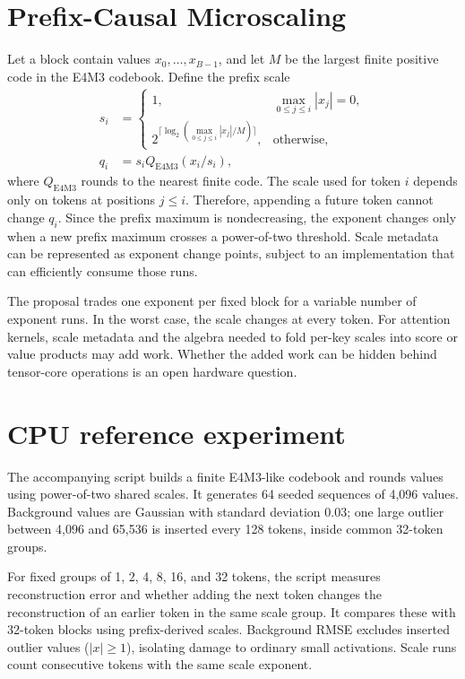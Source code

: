 \documentclass[10pt,twocolumn]{article}
\begin{document}
\section{Prefix-Causal Microscaling}
Let a block contain values $x_0,\ldots,x_{B-1}$, and let $M$ be the largest finite positive code in the E4M3 codebook. Define the prefix scale
\begin{align}
s_i &= \begin{cases}1,&\max_{0\leq j\leq i}|x_j|=0,\\2^{\lceil\log_2(\max_{0\leq j\leq i}|x_j|/M)\rceil},&\text{otherwise},\end{cases}\\
q_i &= s_i Q_{\mathrm{E4M3}}(x_i/s_i),
\end{align}
where $Q_{\mathrm{E4M3}}$ rounds to the nearest finite code. The scale used for token $i$ depends only on tokens at positions $j\leq i$. Therefore, appending a future token cannot change $q_i$. Since the prefix maximum is nondecreasing, the exponent changes only when a new prefix maximum crosses a power-of-two threshold. Scale metadata can be represented as exponent change points, subject to an implementation that can efficiently consume those runs.

The proposal trades one exponent per fixed block for a variable number of exponent runs. In the worst case, the scale changes at every token. For attention kernels, scale metadata and the algebra needed to fold per-key scales into score or value products may add work. Whether the added work can be hidden behind tensor-core operations is an open hardware question.

\section{CPU reference experiment}
The accompanying script builds a finite E4M3-like codebook and rounds values using power-of-two shared scales. It generates 64 seeded sequences of 4,096 values. Background values are Gaussian with standard deviation 0.03; one large outlier between 4,096 and 65,536 is inserted every 128 tokens, inside common 32-token groups.

For fixed groups of 1, 2, 4, 8, 16, and 32 tokens, the script measures reconstruction error and whether adding the next token changes the reconstruction of an earlier token in the same scale group. It compares these with 32-token blocks using prefix-derived scales. Background RMSE excludes inserted outlier values ($|x|\geq1$), isolating damage to ordinary small activations. Scale runs count consecutive tokens with the same scale exponent.
\end{document}
